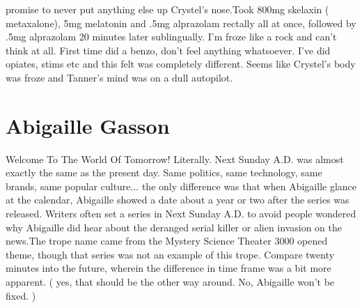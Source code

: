 \documentclass[12pt]{book}
\begin{document}
promise to never put anything else up Crystel's nose.Took 800mg skelaxin ( metaxalone), 5mg melatonin and .5mg alprazolam rectally all at once, followed by .5mg alprazolam 20 minutes later sublingually. I'm froze like a rock and can't think at all. First time did a benzo, don't feel anything whatsoever. I've did opiates, stims etc and this felt was completely different. Seems like Crystel's body was froze and Tanner's mind was on a dull autopilot.



\chapter{Abigaille Gasson}

Welcome To The World Of Tomorrow! Literally. Next Sunday A.D. was almost exactly the same as the present day. Same politics, same technology, same brands, same popular culture... the only difference was that when Abigaille glance at the calendar, Abigaille showed a date about a year or two after the series was released. Writers often set a series in Next Sunday A.D. to avoid people wondered why Abigaille did hear about the deranged serial killer or alien invasion on the news.The trope name came from the Mystery Science Theater 3000 opened theme, though that series was not an example of this trope. Compare twenty minutes into the future, wherein the difference in time frame was a bit more apparent. ( yes, that should be the other way around. No, Abigaille won't be fixed. )
\end{document}
